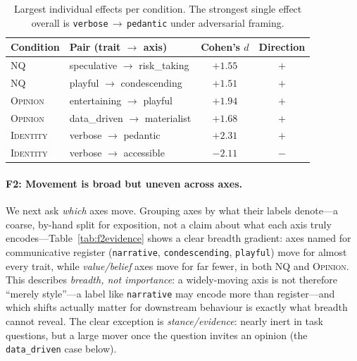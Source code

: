 \documentclass{article}
\newcommand{\ax}[1]{\texttt{#1}}   %
\newcommand{\too}{$\rightarrow$}
\begin{document}
\begin{table}[!htbp]
\centering
\begin{tabular}{llcc}
\toprule
Condition & Pair (trait \too{} axis) & Cohen's $d$ & Direction \\
\midrule
\textsc{NQ}       & speculative \too{} risk\_taking   & $+1.55$ & $+$ \\
\textsc{NQ}       & playful \too{} condescending      & $+1.51$ & $+$ \\
\textsc{Opinion}  & entertaining \too{} playful       & $+1.94$ & $+$ \\
\textsc{Opinion}  & data\_driven \too{} materialist   & $+1.68$ & $+$ \\
\textsc{Identity} & verbose \too{} pedantic           & $+2.31$ & $+$ \\
\textsc{Identity} & verbose \too{} accessible         & $-2.11$ & $-$ \\
\bottomrule
\end{tabular}
\caption{Largest individual effects per condition. The strongest single effect overall is \ax{verbose}\,\too\,\ax{pedantic} under adversarial framing.}
\label{tab:pairs}
\end{table}

\paragraph{F2: Movement is broad but uneven across axes.}
We next ask \emph{which} axes move. Grouping axes by what their labels denote---a coarse, by-hand split for exposition, not a claim about what each axis truly encodes---Table~\ref{tab:f2evidence} shows a clear breadth gradient: axes named for communicative register (\ax{narrative}, \ax{condescending}, \ax{playful}) move for almost every trait, while \emph{value/belief} axes move for far fewer, in both \textsc{NQ} and \textsc{Opinion}. This describes \emph{breadth, not importance}: a widely-moving axis is not therefore ``merely style''---a label like \ax{narrative} may encode more than register---and which shifts actually matter for downstream behaviour is exactly what breadth cannot reveal. The clear exception is \emph{stance/evidence}: nearly inert in task questions, but a large mover once the question invites an opinion (the \ax{data\_driven} case below).
\end{document}
